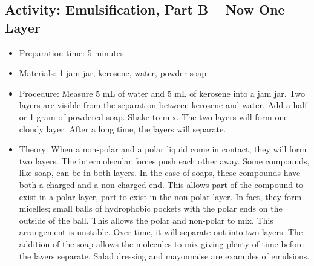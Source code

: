 \begin{itemize}
{\begin{itemize}
\begin{itemize}
{\subsection{Activity: Emulsification, Part B – Now One Layer}
\begin{itemize}
\item{Preparation time: 5 minutes}
\item{Materials: 1 jam jar, kerosene, water, powder soap}
\item{Procedure: Measure 5 mL of water and 5 mL of kerosene into a jam jar. Two layers are visible from the separation between kerosene and water. Add a half or 1 gram of powdered soap. Shake to mix. The two layers will form one cloudy layer. After a long time, the layers will separate.}
\item{Theory: When a non-polar and a polar liquid come in contact, they will form two layers. The intermolecular forces push each other away. Some compounds, like soap, can be in both layers. In the case of soaps, these compounds have both a charged and a non-charged end. This allows part of the compound to exist in a polar layer, part to exist in the non-polar layer. In fact, they form micelles; small balls of hydrophobic pockets with the polar ends on the outside of the ball. This allows the polar and non-polar to mix. This arrangement is unstable. Over time, it will separate out into two layers. The addition of the soap allows the molecules to mix giving plenty of time before the layers separate. Salad dressing and mayonnaise are examples of emulsions.}
\end{itemize}

}
\end{itemize}
\end{itemize}}
\end{itemize}
